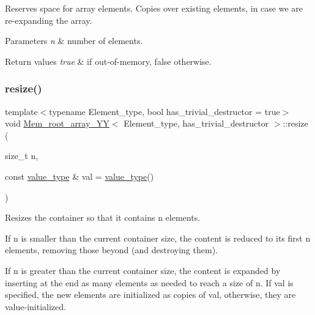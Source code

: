 Reserves space for array elements. Copies over existing elements, in case we are re-\/expanding the array.


\begin{DoxyParams}{Parameters}
{\em n} & number of elements. \\
\hline
\end{DoxyParams}

\begin{DoxyRetVals}{Return values}
{\em true} & if out-\/of-\/memory, false otherwise. \\
\hline
\end{DoxyRetVals}
\mbox{\label{classMem__root__array__YY_aee9a24954393d15680f23e59e9eb5f45}} 
\subsubsection{\texorpdfstring{resize()}{resize()}}
{\footnotesize\ttfamily template$<$typename Element\+\_\+type, bool has\+\_\+trivial\+\_\+destructor = true$>$ \\
void \mbox{\hyperlink{classMem__root__array__YY}{Mem\+\_\+root\+\_\+array\+\_\+\+YY}}$<$ Element\+\_\+type, has\+\_\+trivial\+\_\+destructor $>$\+::resize (\begin{DoxyParamCaption}\item[{size\+\_\+t}]{n,  }\item[{const \mbox{\hyperlink{classMem__root__array__YY_a7cd544d399ee0cf1ac196fbf0da8b3ff}{value\+\_\+type}} \&}]{val = {\ttfamily \mbox{\hyperlink{classMem__root__array__YY_a7cd544d399ee0cf1ac196fbf0da8b3ff}{value\+\_\+type}}()} }\end{DoxyParamCaption})\hspace{0.3cm}{\ttfamily [inline]}}

Resizes the container so that it contains n elements.

If n is smaller than the current container size, the content is reduced to its first n elements, removing those beyond (and destroying them).

If n is greater than the current container size, the content is expanded by inserting at the end as many elements as needed to reach a size of n. If val is specified, the new elements are initialized as copies of val, otherwise, they are value-\/initialized.

